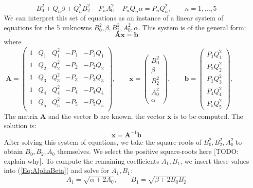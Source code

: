 \begin{equation}
  B_0^2 + Q_n \beta + Q_n^2 B_2^2 - P_n A_0^2 - P_n Q_n \alpha = P_n Q_n^2, \qquad n = 1, \ldots, 5
\end{equation}
We can interpret this set of equations as an instance of a linear system of equations for the 5 unknowns $B_0^2, \beta, B_2^2, A_0^2, \alpha$. This system is of the general form:
\begin{equation}
 \mathbf{A} \mathbf{x} = \mathbf{b}
\end{equation}
where
\begin{equation}
 \mathbf{A} = 
  \begin{pmatrix}
   1 & Q_1 & Q_1^2 & -P_1 & -P_1 Q_1 \\
   1 & Q_2 & Q_2^2 & -P_2 & -P_2 Q_2 \\
   1 & Q_3 & Q_3^2 & -P_3 & -P_3 Q_3 \\
   1 & Q_4 & Q_4^2 & -P_4 & -P_4 Q_4 \\
   1 & Q_5 & Q_5^2 & -P_5 & -P_5 Q_5 \\
  \end{pmatrix}, \qquad
 \mathbf{x} = 
  \begin{pmatrix}
   B_0^2 \\ \beta \\ B_2^2 \\ A_0^2 \\ \alpha
  \end{pmatrix}, \qquad
 \mathbf{b} = 
  \begin{pmatrix}
   P_1 Q_1^2 \\ P_2 Q_2^2 \\ P_3 Q_3^2 \\ P_4 Q_4^2 \\ P_5 Q_5^2
  \end{pmatrix}, \qquad  
\end{equation}
The matrix $\mathbf{A}$ and the vector $\mathbf{b}$ are known, the vector $\mathbf{x}$ is to be computed. The solution is:
\begin{equation}
 \boxed
 {
  \mathbf{x} = \mathbf{A}^{-1} \mathbf{b}
 }
\end{equation}
After solving this system of equations, we take the square-roots of $B_0^2, B_2^2, A_0^2$ to obtain $B_0, B_2, A_0$ themselves. We select the positive square-roots here [TODO: explain why]. To compute the remaining coefficients $A_1, B_1$, we insert these values into (\ref{Eq:AlphaBeta}) and solve for $A_1, B_1$:
\begin{equation}
 \boxed
 {
  A_1 = \sqrt{\alpha + 2 A_0},    \qquad
  B_1 = \sqrt{\beta  + 2 B_0 B_2}
 }
\end{equation}
